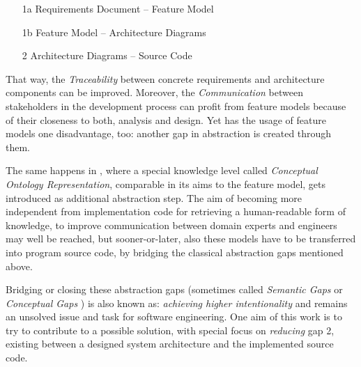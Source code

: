 \begin{enumerate}
    \item[1a] Requirements Document -- Feature Model
    \item[1b] Feature Model -- Architecture Diagrams
    \item[2] Architecture Diagrams -- Source Code
\end{enumerate}

That way, the \emph{Traceability} between concrete requirements and architecture
components can be improved. Moreover, the \emph{Communication} between
stakeholders in the development process can profit from feature models because
of their closeness to both, analysis and design. Yet has the usage of feature
models one disadvantage, too: another gap in abstraction is created through them.

The same happens in \cite{funkat}, where a special knowledge level called
\emph{Conceptual Ontology Representation}, comparable in its aims to the feature
model, gets introduced as additional abstraction step. The aim of becoming more
independent from implementation code for retrieving a human-readable form of
knowledge, to improve communication between domain experts and engineers may
well be reached, but sooner-or-later, also these models have to be transferred
into program source code, by bridging the classical abstraction gaps mentioned
above.

Bridging or closing these abstraction gaps (sometimes called \emph{Semantic Gaps}
or \emph{Conceptual Gaps} \cite{czarnecki}) is also known as: \textit{achieving
higher intentionality} \cite{czarnecki} and remains an unsolved issue and task
for software engineering. One aim of this work is to try to contribute to a
possible solution, with special focus on \emph{reducing} gap 2, existing
between a designed system architecture and the implemented source code.
